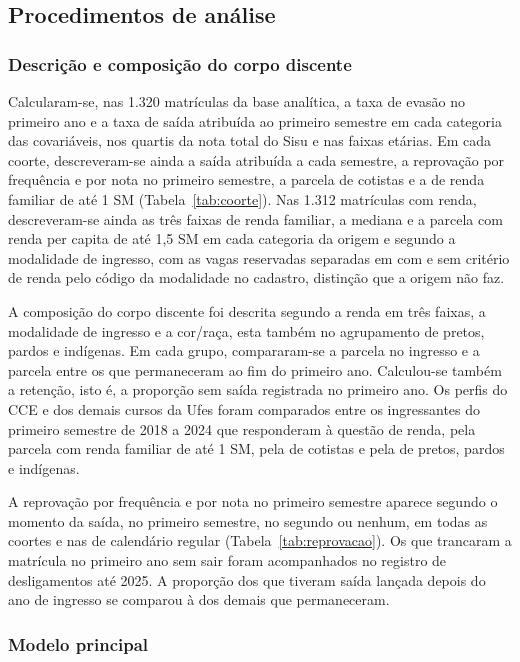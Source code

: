 \documentclass[12pt,a4paper]{article}
\begin{document}
\subsection{Procedimentos de análise}
\label{sec:metodos}

\subsubsection{Descrição e composição do corpo discente}
\label{sec:descritiva}

Calcularam-se, nas 1.320 matrículas da base analítica, a taxa de evasão no primeiro ano e a taxa de saída atribuída ao primeiro semestre em cada categoria das covariáveis, nos quartis da nota total do Sisu e nas faixas etárias. Em cada coorte, descreveram-se ainda a saída atribuída a cada semestre, a reprovação por frequência e por nota no primeiro semestre, a parcela de cotistas e a de renda familiar de até 1 SM (Tabela~\ref{tab:coorte}). Nas 1.312 matrículas com renda, descreveram-se ainda as três faixas de renda familiar, a mediana e a parcela com renda per capita de até 1,5 SM em cada categoria da origem e segundo a modalidade de ingresso, com as vagas reservadas separadas em com e sem critério de renda pelo código da modalidade no cadastro, distinção que a origem não faz.

A composição do corpo discente foi descrita segundo a renda em três faixas, a modalidade de ingresso e a cor/raça, esta também no agrupamento de pretos, pardos e indígenas. Em cada grupo, compararam-se a parcela no ingresso e a parcela entre os que permaneceram ao fim do primeiro ano. Calculou-se também a retenção, isto é, a proporção sem saída registrada no primeiro ano. Os perfis do CCE e dos demais cursos da Ufes foram comparados entre os ingressantes do primeiro semestre de 2018 a 2024 que responderam à questão de renda, pela parcela com renda familiar de até 1 SM, pela de cotistas e pela de pretos, pardos e indígenas.

A reprovação por frequência e por nota no primeiro semestre aparece segundo o momento da saída, no primeiro semestre, no segundo ou nenhum, em todas as coortes e nas de calendário regular (Tabela~\ref{tab:reprovacao}). Os que trancaram a matrícula no primeiro ano sem sair foram acompanhados no registro de desligamentos até 2025. A proporção dos que tiveram saída lançada depois do ano de ingresso se comparou à dos demais que permaneceram.

\subsubsection{Modelo principal}
\label{sec:modelo}
\end{document}
